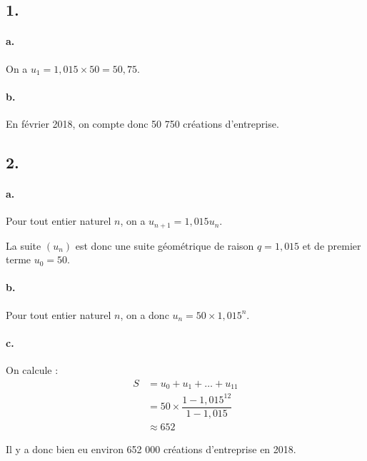 \subsection*{1.}

\paragraph{a.} On a \( u_1 = 1{,}015 \times 50 = 50{,}75 \).

\paragraph{b.} En février 2018, on compte donc 50 750 créations d'entreprise.

\subsection*{2.}

\paragraph{a.} Pour tout entier naturel \( n \), on a \( u_{n+1} = 1{,}015 u_n \).

La suite \( (u_n) \) est donc une suite géométrique de raison \( q = 1{,}015 \) et de premier terme \( u_0 = 50 \).

\paragraph{b.} Pour tout entier naturel \( n \), on a donc \( u_n = 50 \times 1{,}015^n \).

\paragraph{c.} On calcule :
\begin{align*}
S &= u_0 + u_1 + \dots + u_{11} \\
&= 50 \times \dfrac{1 - 1{,}015^{12}}{1 - 1{,}015} \\
&\approx 652
\end{align*}

Il y a donc bien eu environ 652 000 créations d'entreprise en 2018.
